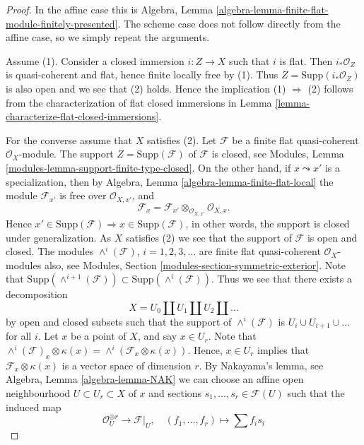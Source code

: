 \begin{proof}
In the affine case this is
Algebra, Lemma \ref{algebra-lemma-finite-flat-module-finitely-presented}.
The scheme case does not follow directly from the affine case, so we
simply repeat the arguments.

\medskip\noindent
Assume (1). Consider a closed immersion $i : Z \to X$ such that $i$ is flat.
Then $i_*\mathcal{O}_Z$ is quasi-coherent and flat, hence finite locally
free by (1). Thus $Z = \text{Supp}(i_*\mathcal{O}_Z)$ is also open and we see
that (2) holds. Hence the implication (1) $\Rightarrow$ (2) follows from
the characterization of flat closed immersions in
Lemma \ref{lemma-characterize-flat-closed-immersions}.

\medskip\noindent
For the converse assume that $X$ satisfies (2).
Let $\mathcal{F}$ be a finite flat quasi-coherent $\mathcal{O}_X$-module.
The support $Z = \text{Supp}(\mathcal{F})$ of $\mathcal{F}$ is closed, see
Modules, Lemma \ref{modules-lemma-support-finite-type-closed}.
On the other hand, if $x \leadsto x'$ is a specialization, then by
Algebra, Lemma \ref{algebra-lemma-finite-flat-local}
the module $\mathcal{F}_{x'}$ is free over $\mathcal{O}_{X, x'}$, and
$$
\mathcal{F}_x =
\mathcal{F}_{x'} \otimes_{\mathcal{O}_{X, x'}} \mathcal{O}_{X, x}.
$$
Hence
$x' \in \text{Supp}(\mathcal{F}) \Rightarrow x \in \text{Supp}(\mathcal{F})$,
in other words, the support is closed under generalization.
As $X$ satisfies (2) we see that the support of $\mathcal{F}$
is open and closed. The modules $\wedge^i(\mathcal{F})$, $i = 1, 2, 3, \ldots$
are finite flat quasi-coherent $\mathcal{O}_X$-modules
also, see
Modules, Section \ref{modules-section-symmetric-exterior}.
Note that
$\text{Supp}(\wedge^{i + 1}(\mathcal{F})) \subset
\text{Supp}(\wedge^i(\mathcal{F}))$.
Thus we see that there exists a decomposition
$$
X = U_0 \coprod U_1 \coprod U_2 \coprod \ldots
$$
by open and closed subsets such that the support of
$\wedge^i(\mathcal{F})$ is $U_i \cup U_{i + 1} \cup \ldots$ for all $i$.
Let $x$ be a point of $X$, and say $x \in U_r$.
Note that
$\wedge^i(\mathcal{F})_x \otimes \kappa(x) = 
\wedge^i(\mathcal{F}_x \otimes \kappa(x))$.
Hence, $x \in U_r$ implies that $\mathcal{F}_x \otimes \kappa(x)$
is a vector space of dimension $r$. By Nakayama's lemma, see
Algebra, Lemma \ref{algebra-lemma-NAK}
we can choose an affine open neighbourhood $U \subset U_r \subset X$
of $x$ and sections $s_1, \ldots, s_r \in \mathcal{F}(U)$ such that
the induced map
$$
\mathcal{O}_U^{\oplus r} \longrightarrow \mathcal{F}|_U,\quad
(f_1, \ldots, f_r) \longmapsto \sum f_i s_i
$$
\end{proof}
